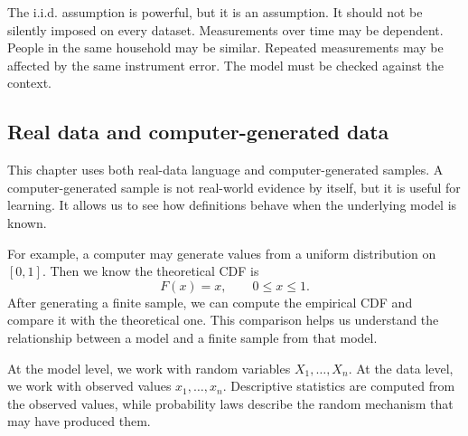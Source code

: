 The i.i.d. assumption is powerful, but it is an assumption. It should not be
silently imposed on every dataset. Measurements over time may be dependent.
People in the same household may be similar. Repeated measurements may be
affected by the same instrument error. The model must be checked against the
context.

\subsection*{Real data and computer-generated data}

This chapter uses both real-data language and computer-generated samples. A
computer-generated sample is not real-world evidence by itself, but it is useful
for learning. It allows us to see how definitions behave when the underlying
model is known.

For example, a computer may generate values from a uniform distribution on
\([0,1]\). Then we know the theoretical CDF is
\[
F(x)=x,
\qquad 0\leq x\leq1.
\]
After generating a finite sample, we can compute the empirical CDF and compare it
with the theoretical one. This comparison helps us understand the relationship
between a model and a finite sample from that model.

\begin{summarybox}
At the model level, we work with random variables \(X_1,\ldots,X_n\). At the data
level, we work with observed values \(x_1,\ldots,x_n\). Descriptive statistics are
computed from the observed values, while probability laws describe the random
mechanism that may have produced them.
\end{summarybox}
